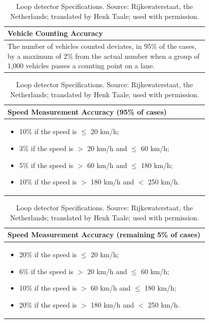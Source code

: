 \begin{table}[htp]
\centering
\begin{tabular}{p{0.8\linewidth}}
\toprule
\textbf{Vehicle Counting Accuracy} \\
\midrule
The number of vehicles counted deviates, in 95\% of the cases, by a maximum of 2\% from the actual number when a group of 1,000 vehicles passes a counting point on a lane. \\
\bottomrule
\end{tabular}

\vspace{0.1cm}

\begin{tabular}{p{0.8\linewidth}}
\toprule
\textbf{Speed Measurement Accuracy (95\% of cases)} \\
\midrule
\begin{itemize}
    \item 10\% if the speed is $\leq$ 20 km/h;
    \item 3\% if the speed is $>$ 20 km/h and $\leq$ 60 km/h;
    \item 5\% if the speed is $>$ 60 km/h and $\leq$ 180 km/h;
    \item 10\% if the speed is $>$ 180 km/h and $<$ 250 km/h.
\end{itemize} \\
\bottomrule
\end{tabular}

\vspace{0.1cm}

\begin{tabular}{p{0.8\linewidth}}
\toprule
\textbf{Speed Measurement Accuracy (remaining 5\% of cases)} \\
\midrule
\begin{itemize}
    \item 20\% if the speed is $\leq$ 20 km/h;
    \item 6\% if the speed is $>$ 20 km/h and $\leq$ 60 km/h;
    \item 10\% if the speed is $>$ 60 km/h and $\leq$ 180 km/h;
    \item 20\% if the speed is $>$ 180 km/h and $<$ 250 km/h.
\end{itemize} \\
\bottomrule
\end{tabular}
\caption{Loop detector Specifications. Source: Rijkswaterstaat, the Netherlands; translated by Henk Taale; used with permission. }
    \label{Loop detector Specifications. Source: Henk Taale, used with permission}
\end{table}

